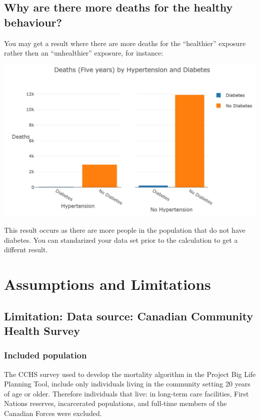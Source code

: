 \documentclass[]{book}
\begin{document}
\subsection{Why are there more deaths for the healthy
behaviour?}\label{why-are-there-more-deaths-for-the-healthy-behaviour}

You may get a result where there are more deaths for the ``healthier''
exposure rather then an ``unhealthier'' exposure, for instance:

\begin{center}\includegraphics{Images/Graph-hypertension-diabetes} \end{center}

This result occurs as there are more people in the population that do
not have diabetes. You can standarized your data set prior to the
calculation to get a differnt result.

\section{Assumptions and Limitations}\label{assumptions-and-limitations}

\subsection{Limitation: Data source: Canadian Community Health
Survey}\label{limitation-data-source-canadian-community-health-survey}

\subsubsection{Included population}\label{included-population}

The CCHS survey used to develop the mortality algorithm in the Project
Big Life Planning Tool, include only individuals living in the community
setting 20 years of age or older. Therefore individuals that live: in
long-term care facilities, First Nations reserves, incarcerated
populations, and full-time members of the Canadian Forces were excluded.
\end{document}
